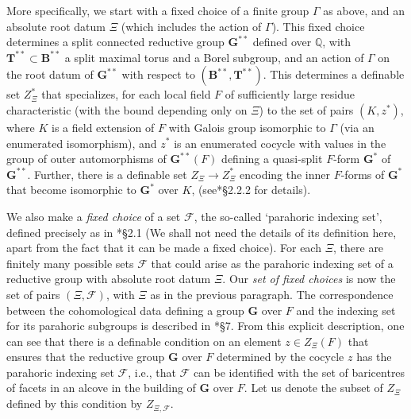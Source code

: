 \documentclass{amsart}
\newcommand{\Q}{{\mathbb Q}}
\newcommand{\cF}{\mathcal{F}}
\newcommand{\GL}{\mathbf {GL}}
\newcommand{\bG}{\mathbf{G}}
\newcommand{\bT}{\mathbf {T}}
\newcommand{\bB}{\mathbf {B}}
\theoremstyle{plain}
\theoremstyle{definition}
\begin{document}
More specifically, we start with a fixed choice  of a finite group $\Gamma$ as above, and an absolute root datum
$\Xi$ (which includes the action of $\Gamma$). This fixed choice determines  a split connected reductive group $\bG^{\ast\ast}$ defined over $\Q$,
with $\bT^{\ast\ast}\subset \bB^{\ast\ast}$ a split maximal torus and a Borel subgroup, and an action of $\Gamma$  on the root datum of $\bG^{\ast\ast}$
with respect to $(\bB^{\ast\ast}, \bT^{\ast\ast})$.  This determines a definable set $Z_{\Xi}^\ast$ that specializes,
for each local field $F$ of sufficiently large residue characteristic (with the bound depending only on $\Xi$)
to the set of pairs $(K, z^\ast)$, where $K$ is a field extension of $F$ with Galois group isomorphic to $\Gamma$
(via an enumerated isomorphism), and $z^\ast$ is an enumerated cocycle  with values in the group of outer automorphisms of $\bG^{\ast\ast}(F)$
defining a quasi-split $F$-form
$\bG^\ast$ of $\bG^{\ast\ast}$. Further, there is a definable set $Z_{\Xi}\to Z_{\Xi}^\ast$ encoding the inner $F$-forms of $\bG^\ast$ that become isomorphic to $\bG^{\ast}$ over $K$, (see\cite{gordon-hales:15a}*{\S 2.2.2} for details).


We also make a \emph{fixed choice} of a set $\cF$, the so-called `parahoric indexing set', defined precisely as in \cite{gordon-hales:15a}*{\S 2.1}
(We shall not need the details of its definition here, apart from the fact that it can be made a fixed choice).
For each $\Xi$, there are finitely many possible sets $\cF$ that could arise as the parahoric indexing set of a
reductive group with absolute root datum $\Xi$.
Our \emph{set of fixed choices} is now the set of pairs $(\Xi, \cF)$, with $\Xi$ as in the previous paragraph.
The correspondence between the cohomological data defining a group $\bG$ over $F$ and the indexing set for its
parahoric subgroups is described in \cite{gross:parahorics}*{\S 7}. From this explicit description, one can see that
there is a definable condition on an element $z\in Z_\Xi(F)$ that ensures that
the reductive group $\bG$ over $F$ determined by the cocycle $z$ has the parahoric indexing set $\cF$, i.e.,
that $\cF$ can be identified with the set of baricentres of facets in an alcove in the building of $\bG$ over $F$.
Let us denote the subset of $Z_\Xi$ defined by this condition by $Z_{\Xi, \cF}$.
\end{document}

